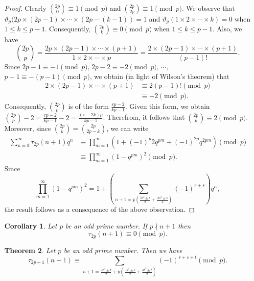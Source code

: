 \documentclass[10pt]{article}
\newtheorem{theorem}{Theorem}[section]
\newtheorem{corollary}[theorem]{Corollary}
\theoremstyle{definition}
\begin{document}
\begin{proof}
Clearly ${2p\choose{0}}\equiv 1\pmod{p}$ and ${2p\choose{2p}}\equiv1\pmod{p}$. We observe that $\vartheta_p(2p\times (2p-1)\times \cdots \times (2p-(k-1))=1$ and $\vartheta_p(1\times 2\times \cdots \times k)=0$ when $1\leq k\leq p-1$. Consequently, ${{2p}\choose{k}}\equiv 0\pmod{p}$ when $1\leq k \leq p-1$. Also, we have
\[{{2p}\choose{p}}=\frac{2p\times (2p-1)\times\cdots 
\times(p+1)}{1\times 2\times \cdots \times p}=\frac{2\times (2p-1)\times\cdots 
\times(p+1)}{(p-1)!}.
\]
Since
$2p-1\equiv-1\pmod{p}$, $2p-2\equiv -2\pmod{p}$, $\cdots$, $p+1\equiv -(p-1)\pmod{p}$, we obtain (in light of Wilson's theorem) that 
\begin{align*}
2\times(2p-1)\times\cdots 
\times(p+1)&\equiv2(p-1)!\pmod{p}\\
&\equiv -2\pmod{p}.
\end{align*} 
Consequently, ${{2p}\choose{p}}$ is of the form $\frac{rp-2}{kp-1}$. Given this form, we obtain ${{2p}\choose{p}}-2=\frac{rp-2}{kp-1}-2=\frac{(r-2k)p}{kp-1}$.
Therefrom, it follows that ${{2p}\choose{p}}\equiv 2\pmod{p}$. Moreover, since ${{2p}\choose{k}}={{2p}\choose{2p-k}}$, we can write
\begin{align*}
\sum_{n=0}^{\infty}\tau_{2p}(n+1)q^n
&\equiv\prod_{m=1}^{\infty}\left(1+(-1)^{p}2q^{pm}+(-1)^{2p}q^{2pm}\right)\pmod{p}\\ 
&\equiv\prod_{m=1}^{\infty}(1-q^{pm})^2\pmod{p}.
\end{align*}
Since 
\[\prod_{m=1}^{\infty}(1-q^{pm})^2=1+\left(\sum_{n+1=p\left(\frac{3r^2\pm r}{2}+\frac{3s^2\pm s}{2}\right)}(-1)^{r+s}\right)q^n,
\]
the result follows as a consequence of the above observation.
\end{proof}
\begin{corollary}
Let $p$ be an odd prime number. If $p\nmid n+1$ then
\[\tau_{2p}(n+1)\equiv 0\pmod{p}.
\]
\end{corollary}
\begin{theorem}
Let $p$ be an odd prime number. Then we have
\begin{equation}
\tau_{2p+1}(n+1)\equiv\sum_{n+1=\frac{3r^2\pm r}{2}+p\left(\frac{3s^2\pm s}{2}+\frac{3t^2\pm t}{2}\right)}(-1)^{r+s+t}\pmod{p}.
\end{equation}
\end{theorem}
\end{document}
